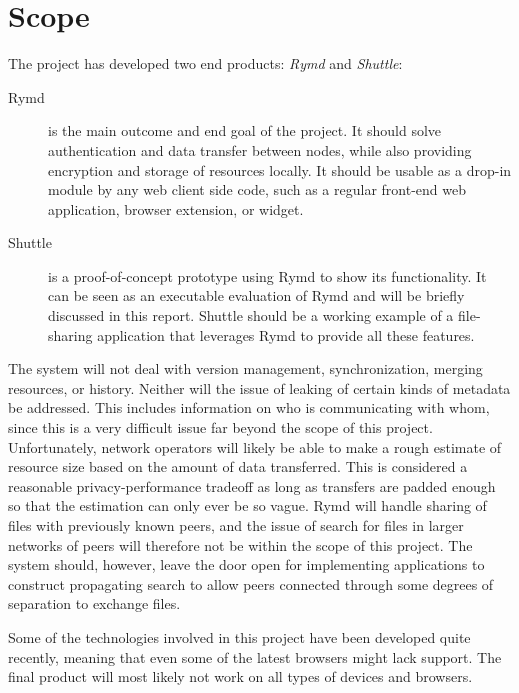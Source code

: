 \section{Scope}

The project has developed two end products: \emph{Rymd} and \emph{Shuttle}:

\begin{description}
\item[Rymd] is the main outcome and end goal of the project. It should solve authentication and data transfer between nodes, while also providing encryption and storage of resources locally. It should be usable as a drop-in module by any web client side code, such as a regular front-end web application, browser extension, or widget.

\item[Shuttle] is a proof-of-concept prototype using Rymd to show its functionality. It can be seen as an executable evaluation of Rymd and will be briefly discussed in this report. Shuttle should be a working example of a file-sharing application that leverages Rymd to provide all these features.
\end{description}

The system will not deal with version management, synchronization, merging resources, or history. Neither will the issue of leaking of certain kinds of metadata be addressed. This includes information on who is communicating with whom, since this is a very difficult issue far beyond the scope of this project. Unfortunately, network operators will likely be able to make a rough estimate of resource size based on the amount of data transferred. This is considered a reasonable privacy-performance tradeoff as long as transfers are padded enough so that the estimation can only ever be so vague. Rymd will handle sharing of files with previously known peers, and the issue of search for files in larger networks of peers will therefore not be within the scope of this project. The system should, however, leave the door open for implementing applications to construct propagating search to allow peers connected through some degrees of separation to exchange files.

Some of the technologies involved in this project have been developed quite recently, meaning that even some of the latest browsers might lack support. The final product will most likely not work on all types of devices and browsers.
